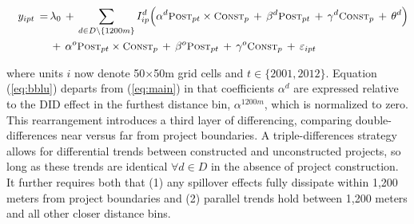 \documentclass[12pt]{article}
\begin{document}
\vspace{-4mm}

\begin{equation} \label{eq:bblu}
\begin{aligned}
\quad y_{ipt} \, =& \, \lambda_{0} \,+\, \sum\limits_{d\in D\setminus\{1200m\}} I^d_{ip}\Big( \alpha^d \textsc{\small Post}_{pt}\times\textsc{\small Const}_{p} \, + \, \beta^d\textsc{\small Post}_{pt} \, + \, \gamma^d\textsc{\small Const}_{p} \, + \, \theta^{d} \Big) \\
& \, + \, \alpha^o \textsc{\small Post}_{pt}\times\textsc{\small Const}_{p} \, + \, \beta^o\textsc{\small Post}_{pt} \, + \, \gamma^o\textsc{\small Const}_{p} \, + \, \varepsilon_{ipt} \quad 
\end{aligned}
\end{equation}

\noindent where units $i$ now denote 50$\times$50m grid cells and $t\in\{2001,2012\}$. Equation (\ref{eq:bblu}) departs from (\ref{eq:main}) in that coefficients $\alpha^d$ are expressed relative to the DID effect in the furthest distance bin, $\alpha^{1200m}$, which is normalized to zero. This rearrangement introduces  a third layer of differencing, comparing double-differences near versus far from project boundaries. A triple-differences strategy allows for differential trends between constructed and unconstructed projects, so long as these trends are identical $\forall d\in D$ in the absence of project construction. It further requires both that (1) any spillover effects fully dissipate within 1,200 meters from project boundaries and (2) parallel trends hold between 1,200 meters and all other closer distance bins.


% 
\end{document}
